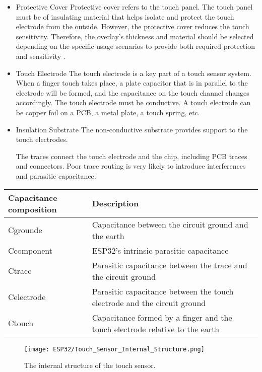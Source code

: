 \begin{itemize}
	\item Protective Cover
	Protective cover refers to the touch panel. The touch panel must be of insulating material that helps isolate and protect the touch electrode from the outside. However, the protective cover reduces the touch sensitivity. Therefore, the overlay's thickness and material should be selected depending on the specific usage scenarios to provide both required protection and sensitivity \cite{Rajalakshmi:2017}.
	\item Touch Electrode
	The touch electrode is a key part of a touch sensor system. When a finger touch takes place, a plate capacitor that is in parallel to the electrode will be formed, and the capacitance on the touch channel changes accordingly. The touch electrode must be conductive. A touch electrode can be copper foil on a PCB, a metal plate, a touch spring, etc.
	\item Insulation Substrate
	The non-conductive substrate provides support to the touch electrodes.
	
	\itemTraces The traces connect the touch electrode and the chip, including PCB traces and connectors. Poor trace routing is very likely to introduce interferences and parasitic capacitance.
\end{itemize}

\begin{center} %
	\begin{tabular}{|l|l|} %
		\hline %
		\textbf{Capacitance composition} & \textbf{Description} \\
		\hline %
		Cgrounde & Capacitance between the circuit ground and the earth \\
		\hline
		Ccomponent & ESP32's intrinsic parasitic capacitance \\
		\hline
		Ctrace & Parasitic capacitance between the trace and the circuit ground \\
		\hline
		Celectrode & Parasitic capacitance between the touch electrode and the circuit ground  \\
		\hline
		Ctouch & Capacitance formed by a finger and the touch electrode relative to the earth  \\
		
		\hline %
	\end{tabular}
\end{center}

\begin{figure}  
	\begin{center}
		\texttt{[image: ESP32/Touch\_Sensor\_Internal\_Structure.png]}
		\caption{The internal structure of the touch sensor.} 
		\label{fig:Python 3.10.}
	\end{center}
\end{figure}	

